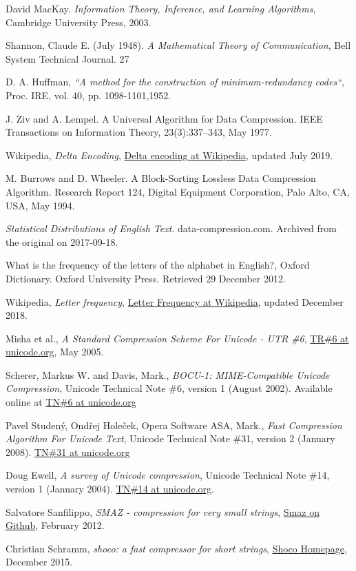 \documentclass[]{article}
\begin{document}
\begin{thebibliography}{1}

	 David MacKay. {\em Information Theory, Inference, and Learning Algorithms}, Cambridge University Press, 2003.

	 Shannon, Claude E. (July 1948). {\em A Mathematical Theory of Communication}, Bell System Technical Journal. 27
 
	 D. A. Huffman, {\em“A method for the construction of minimum-redundancy codes“}, Proc. IRE, vol. 40, pp. 1098-1101,1952.
 
 	 J. Ziv and A. Lempel. A Universal Algorithm for Data Compression. IEEE Transactions on Information Theory, 23(3):337–343, May 1977.
 
  	 Wikipedia, {\em Delta Encoding}, \href{https://en.wikipedia.org/wiki/Delta\_encoding}{Delta encoding at Wikipedia}, updated July 2019.
 
	 M. Burrows and D. Wheeler. A Block-Sorting Lossless Data Compression Algorithm. Research Report 124, Digital Equipment Corporation, Palo Alto, CA, USA, May 1994.

	 {\em Statistical Distributions of English Text}. data-compression.com. Archived from the original on 2017-09-18.

 	 What is the frequency of the letters of the alphabet in English?, Oxford Dictionary. Oxford University Press. Retrieved 29 December 2012.

	 Wikipedia, {\em Letter frequency}, \href{https://en.wikipedia.org/wiki/Letter\_frequency}{Letter Frequency at Wikipedia}, updated December 2018.

	 Misha et al., {\em A Standard Compression Scheme For Unicode - UTR \#6}, \href{https://www.unicode.org/reports/tr6/tr6-4.html}{TR\#6 at unicode.org}, May 2005.

	 Scherer, Markus W. and Davis, Mark., {\em BOCU-1: MIME-Compatible Unicode Compression}, Unicode Technical Note \#6, version 1 (August 2002). Available online at \href{http://www.unicode.org/notes/tn6/}{TN\#6 at unicode.org}

	 Pavel Studený, Ondřej Holeček, Opera Software ASA, Mark., {\em Fast Compression Algorithm For Unicode Text}, Unicode Technical Note \#31, version 2 (January 2008). \href{http://www.unicode.org/notes/tn31}{TN\#31 at unicode.org}

	 Doug Ewell, {\em A survey of Unicode compression}, Unicode Technical Note \#14, version 1 (January 2004). \href{http://www.unicode.org/notes/tn14/}{TN\#14 at unicode.org}.

 	 Salvatore Sanfilippo, {\em SMAZ - compression for very small strings}, \href{https://github.com/antirez/smaz}{Smaz on Github}, February 2012.

 	 Christian Schramm, {\em shoco: a fast compressor for short strings}, \href{https://ed-von-schleck.github.io/shoco}{Shoco Homepage}, December 2015.

\end{thebibliography}
\end{document}

